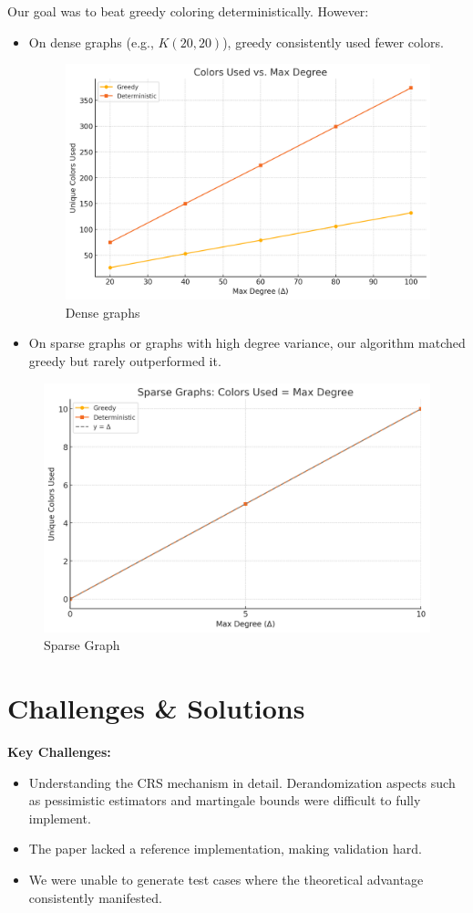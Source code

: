 \documentclass[11pt]{article}
\begin{document}
Our goal was to beat greedy coloring deterministically. However:
\begin{itemize}
  \item On dense graphs (e.g., $K(20, 20)$), greedy consistently used fewer colors.
  \begin{figure}[H]
    \centering
    \includegraphics[width=0.5\linewidth]{color vs max dergee.png}
    \caption{Dense graphs}
    \label{fig:enter-label}
\end{figure}
  \item On sparse graphs or graphs with high degree variance, our algorithm matched greedy but rarely outperformed it.
\end{itemize}

\begin{figure}[H]
    \centering
    \includegraphics[width=0.5\linewidth]{sparse 1.png}
    \caption{Sparse Graph}
    \label{fig:enter-label}
\end{figure}

\section{Challenges \& Solutions}

\textbf{Key Challenges:}
\begin{itemize}
  \item Understanding the CRS mechanism in detail. Derandomization aspects such as pessimistic estimators and martingale bounds were difficult to fully implement.
  \item The paper lacked a reference implementation, making validation hard.
  \item We were unable to generate test cases where the theoretical advantage consistently manifested.
\end{itemize}
\end{document}
